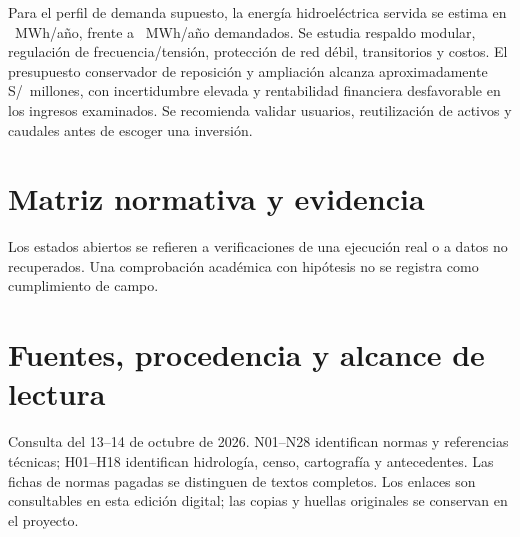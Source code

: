 \documentclass[11pt,letterpaper]{report}
\begin{document}
Para el perfil de demanda supuesto, la energía hidroeléctrica servida se estima en \ MWh/año, frente a \ MWh/año demandados. Se estudia respaldo modular, regulación de frecuencia/tensión, protección de red débil, transitorios y costos. El presupuesto conservador de reposición y ampliación alcanza aproximadamente S/\ millones, con incertidumbre elevada y rentabilidad financiera desfavorable en los ingresos examinados. Se recomienda validar usuarios, reutilización de activos y caudales antes de escoger una inversión.

\begingroup\small\setlength{\parskip}{0pt}\tableofcontents\endgroup
\clearpage{}












\appendix
\chapter{Matriz normativa y evidencia}
Los estados abiertos se refieren a verificaciones de una ejecución real o a datos no recuperados. Una comprobación académica con hipótesis no se registra como cumplimiento de campo.
\begingroup\footnotesize\renewcommand{\arraystretch}{1.08}\endgroup
\chapter{Fuentes, procedencia y alcance de lectura}
Consulta del 13--14 de octubre de 2026. N01--N28 identifican normas y referencias técnicas; H01--H18 identifican hidrología, censo, cartografía y antecedentes. Las fichas de normas pagadas se distinguen de textos completos. Los enlaces son consultables en esta edición digital; las copias y huellas originales se conservan en el proyecto.
\begingroup\small\endgroup
\end{document}
